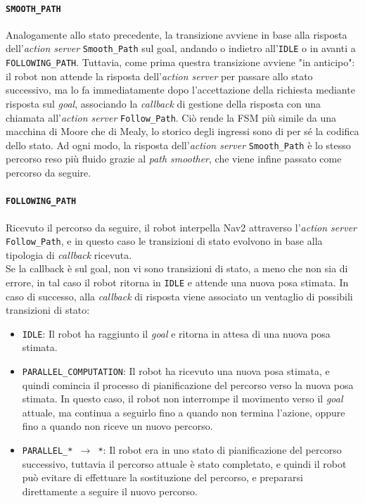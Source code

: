 \documentclass[12pt]{article}
\begin{document}
\paragraph{\texttt{SMOOTH\_PATH}} Analogamente allo stato precedente, la transizione avviene in base alla risposta dell'\textit{action server} \texttt{Smooth\_Path} sul goal, andando o indietro all'\texttt{IDLE} o in avanti a \texttt{FOLLOWING\_PATH}. Tuttavia, come prima questra transizione avviene "in anticipo": il robot non attende la risposta dell'\textit{action server} per passare allo stato successivo, ma lo fa immediatamente dopo l'accettazione della richiesta mediante risposta sul \textit{goal}, associando la \textit{callback} di gestione della risposta con una chiamata all'\textit{action server} \texttt{Follow\_Path}. Ciò rende la FSM più simile da una macchina di Moore che di Mealy, lo storico degli ingressi sono di per sé la codifica dello stato. Ad ogni modo, la risposta dell'\textit{action server} \texttt{Smooth\_Path} è lo stesso percorso reso più fluido grazie al \textit{path smoother}, che viene infine passato come percorso da seguire.
\paragraph{\texttt{FOLLOWING\_PATH}} Ricevuto il percorso da seguire, il robot interpella Nav2 attraverso l'\textit{action server} \texttt{Follow\_Path}, e in questo caso le transizioni di stato evolvono in base alla tipologia di \textit{callback} ricevuta.
\\[1em]
Se la callback è sul goal, non vi sono transizioni di stato, a meno che non sia di errore, in tal caso il robot ritorna in \texttt{IDLE} e attende una nuova posa stimata. In caso di successo, alla \textit{callback} di risposta viene associato un ventaglio di possibili transizioni di stato: \begin{itemize}
    \item \texttt{IDLE}: Il robot ha raggiunto il \textit{goal} e ritorna in attesa di una nuova posa stimata.
    \item \texttt{PARALLEL\_COMPUTATION}: Il robot ha ricevuto una nuova posa stimata, e quindi comincia il processo di pianificazione del percorso verso la nuova posa stimata. In questo caso, il robot non interrompe il movimento verso il \textit{goal} attuale, ma continua a seguirlo fino a quando non termina l'azione, oppure fino a quando non riceve un nuovo percorso.
    \item \texttt{PARALLEL\_* $\rightarrow$ *}: Il robot era in uno stato di pianificazione del percorso successivo, tuttavia il percorso attuale è stato completato, e quindi il robot può evitare di effettuare la sostituzione del percorso, e prepararsi direttamente a seguire il nuovo percorso. 
\end{itemize}
\end{document}
